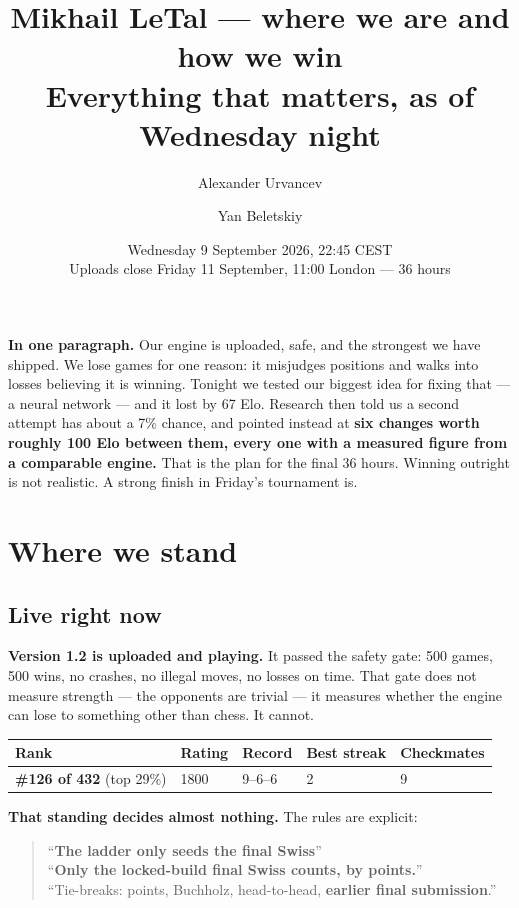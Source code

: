 \documentclass[11pt,a4paper]{article}
\title{\textbf{Mikhail LeTal --- where we are and how we win}\\[0.4em]
\large Everything that matters, as of Wednesday night}
\author{Alexander Urvancev \and Yan Beletskiy}
\date{Wednesday 9 September 2026, 22:45 CEST \\[0.3em]
\small Uploads close Friday 11 September, 11:00 London --- 36 hours}
\newcommand{\good}[1]{\textcolor{teal!70!black}{\textbf{#1}}}
\begin{document}
\maketitle\thispagestyle{empty}

\begin{keybox}
\textbf{In one paragraph.} Our engine is uploaded, safe, and the strongest we have shipped. We
lose games for one reason: it misjudges positions and walks into losses believing it is winning.
Tonight we tested our biggest idea for fixing that --- a neural network --- and it lost by 67 Elo.
Research then told us a second attempt has about a 7\% chance, and pointed instead at
\textbf{six changes worth roughly 100 Elo between them, every one with a measured figure from a
comparable engine.} That is the plan for the final 36 hours. Winning outright is not realistic.
A strong finish in Friday's tournament is.
\end{keybox}

\tableofcontents
\newpage

\section{Where we stand}

\subsection{Live right now}

\textbf{Version 1.2 is uploaded and playing.} It passed the safety gate: 500 games, 500 wins, no
crashes, no illegal moves, no losses on time. That gate does not measure strength --- the
opponents are trivial --- it measures whether the engine can lose to something other than chess.
It cannot.

\begin{center}
\begin{tabular}{lllll}
\toprule
Rank & Rating & Record & Best streak & Checkmates \\
\midrule
\good{\#126 of 432} (top 29\%) & 1800 & 9--6--6 & 2 & 9 \\
\bottomrule
\end{tabular}
\end{center}

\textbf{That standing decides almost nothing.} The rules are explicit:

\begin{quote}
``\textbf{The ladder only seeds the final Swiss}''\\
``\textbf{Only the locked-build final Swiss counts, by points.}''\\
``Tie-breaks: points, Buchholz, head-to-head, \textbf{earlier final submission}.''
\end{quote}
\end{document}
